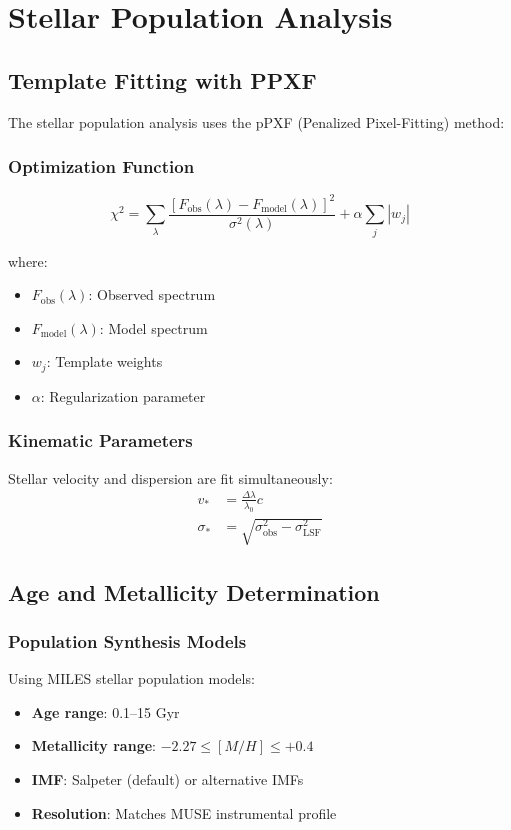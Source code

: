 \documentclass[12pt,a4paper]{article}
\begin{document}
\section{Stellar Population Analysis}

\subsection{Template Fitting with PPXF}

The stellar population analysis uses the pPXF (Penalized Pixel-Fitting) method:

\subsubsection{Optimization Function}
\begin{equation}
\chi^2 = \sum_{\lambda} \frac{[F_{\text{obs}}(\lambda) - F_{\text{model}}(\lambda)]^2}{\sigma^2(\lambda)} + \alpha \sum_{j} |w_j|
\end{equation}

where:
\begin{itemize}
    \item $F_{\text{obs}}(\lambda)$: Observed spectrum
    \item $F_{\text{model}}(\lambda)$: Model spectrum
    \item $w_j$: Template weights
    \item $\alpha$: Regularization parameter
\end{itemize}

\subsubsection{Kinematic Parameters}
Stellar velocity and dispersion are fit simultaneously:
\begin{align}
v_* &= \frac{\Delta\lambda}{\lambda_0} c \\
\sigma_* &= \sqrt{\sigma_{\text{obs}}^2 - \sigma_{\text{LSF}}^2}
\end{align}

\subsection{Age and Metallicity Determination}

\subsubsection{Population Synthesis Models}
Using MILES stellar population models:
\begin{itemize}
    \item \textbf{Age range}: 0.1--15 Gyr
    \item \textbf{Metallicity range}: $-2.27 \leq [M/H] \leq +0.4$
    \item \textbf{IMF}: Salpeter (default) or alternative IMFs
    \item \textbf{Resolution}: Matches MUSE instrumental profile
\end{itemize}
\end{document}
